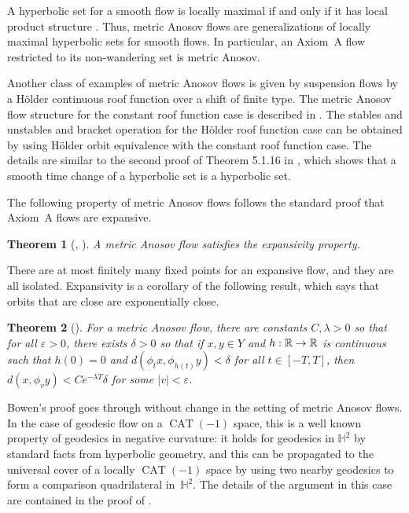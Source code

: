 \documentclass[11pt]{article}
\let\epsilon\varepsilon
\newtheorem{thm}{Theorem}[section]
\theoremstyle{definition}
\numberwithin{equation}{section}
\newcommand\R{\ifmmode{\mathbb R}\else{$\mathbb R$}\fi}
\DeclareMathOperator{\CAT}{CAT}
\begin{document}
A hyperbolic set for a smooth flow is locally maximal if and only if it has local product structure \cite[Th.\,6.2.7]{FH}. Thus, metric Anosov flows are generalizations of locally maximal hyperbolic sets for smooth flows. In particular, an Axiom~A flow restricted to its non-wandering set is metric Anosov.

Another class of examples of metric Anosov flows is given by suspension flows by a Hölder continuous roof function over a shift of finite type. The metric Anosov flow structure for the constant roof function case is described in \cite{pollicott}. The stables and unstables and bracket operation for the Hölder roof function case can be obtained by using Hölder orbit equivalence with the constant roof function case. The details are similar to the second proof of Theorem 5.1.16 in \cite[\S6.1]{FH}, which shows that a smooth time change of a hyperbolic set is a hyperbolic set.

The following property of metric Anosov flows follows the standard proof that Axiom~A flows are expansive.
\begin{thm}[{\cite[Cor.\,1.6]{bowen-symbolic}, \cite[Prop.\,1]{pollicott}}]
A metric Anosov flow satisfies the expansivity property.
\end{thm}
There are at most finitely many fixed points for an expansive flow, and they are all isolated. Expansivity is a corollary of the following result, which says that orbits that are close are exponentially close.

\begin{thm}[{\cite[Lem.\,1.5]{bowen-symbolic}}]\label{expclose}
For a metric Anosov flow, there are constants $C, \lambda>0$ so that for all $\epsilon>0$, there exists $\delta>0$ so that if $x,y \in Y$ and \hbox{$h: \R \to \R$} is continuous such that $h(0)=0$ and $d(\phi_t x, \phi_{h(t)} y) < \delta$ for all $t \in [-T, T]$, then $d(x, \phi_v y)< C e^{-\lambda T}\delta$ for some $|v| < \epsilon$.
\end{thm}

Bowen's proof goes through without change in the setting of metric Anosov flows. In the case of geodesic flow on a $\CAT(-1)$ space, this is a well known property of geodesics in negative curvature: it holds for geodesics in $\mathbb{H}^2$ by standard facts from hyperbolic geometry, and this can be propagated to the universal cover of a locally $\CAT(-1)$ space by using two nearby geodesics to form a comparison quadrilateral in~$\mathbb{H}^2$. The details of the argument in this case are contained in the proof of \cite[Prop.\,4.3]{CLT}.
\end{document}
